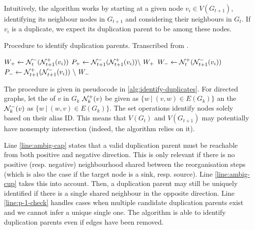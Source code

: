 \documentclass[
	fontsize=10pt, %
	twoside=false, %
	secnumdepth=1, %
  toc=indentunnumbered %
]{kaobook}
\begin{document}
Intuitively, the algorithm works by starting at a given node $v_i \in
V(G_{t+1})$, identifying its neighbour nodes in $G_{t+1}$ and considering their
neighbours in $G_t$. If $v_i$ is a duplicate, we expect its duplication parent
to be among these nodes.

\begin{algorithm}[h]
  \DontPrintSemicolon
  \label{alg:identify-duplicates}
  \caption{ Procedure to identify duplication parents. Transcribed from
    \citeauthor{nielsen_MachineLearningSupport_2019} \cite{nielsen_MachineLearningSupport_2019}.
  }
     $W_+ \gets \mathcal{N}_t^- ( \mathcal{N}_{t+1}^+(v_i) )$ \; $P_+ \gets
  \mathcal{N}_{t+1}^- ( \mathcal{N}_{t+1}^+(v_i) ) \backslash~ W_+$ \; $W_- \gets
  \mathcal{N}_t^+ ( \mathcal{N}_{t+1}^-(v_i) ) $ \; $P_- \gets \mathcal{N}_{t+1}^+ (
  \mathcal{N}_{t+1}^-(v_i) ) ~\backslash~ W_- $\;
\end{algorithm}

The procedure is given in pseudocode in \ref{alg:identify-duplicates}. For
directed graphs, let the  of $v$ in $G_k$ $\mathcal{N}_k^+(v)$ be
given as $\{w ~|~ (v,w) \in E(G_{k})\}$ an the 
$\mathcal{N}_k^-(v)$ as $\{w ~|~ (w,v) \in E(G_k)\}$.
The set operations identify nodes solely based on their alias ID. This means that
$V(G_t)$ and $V(G_{t+1})$ may potentially have nonempty intersection (indeed,
the algorithm relies on it).

Line \ref{line:ambig-cap} states that a valid duplication parent must be
reachable from both positive and negative direction. This is only relevant if
there is no positive (resp. negative) neighbourhood shared between the
reorganisation steps (which is also the case if the target node is a sink, 
resp. source). Line \ref{line:ambig-cup} takes this into account. Then, a
duplication parent may still be uniquely identified if there is a single shared
neighbour in the opposite direction.
Line \ref{line:p-1-check} handles cases when multiple candidate duplication
parents exist and we cannot infer a unique single one.
The algorithm is able to identify duplication parents even if edges have been
removed.
\end{document}
